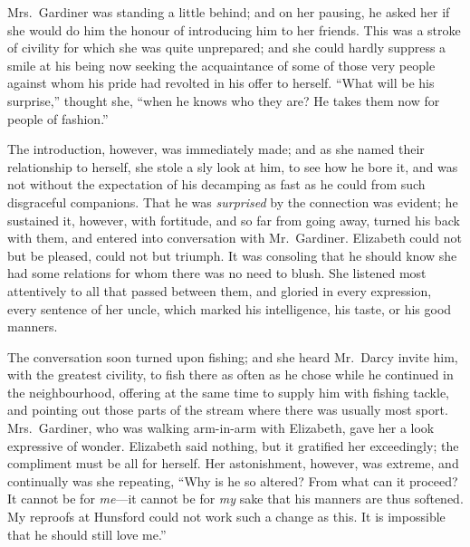 \documentclass[12pt,english,oneside]{book}
\begin{document}
Mrs.\ Gardiner was standing a little behind; and on her pausing,
he asked her if she would do him the honour of introducing him to
her friends. This was a stroke of civility for which she was quite
unprepared; and she could hardly suppress a smile at his being now
seeking the acquaintance of some of those very people against whom
his pride had revolted in his offer to herself. {}``What will be
his surprise,'' thought she, {}``when he knows who they are? He
takes them now for people of fashion.''

The introduction, however, was immediately made; and as she named
their relationship to herself, she stole a sly look at him, to see
how he bore it, and was not without the expectation of his decamping
as fast as he could from such disgraceful companions. That he was
\textit{surprised} by the connection was evident; he sustained it,
however, with fortitude, and so far from going away, turned his back
with them, and entered into conversation with Mr.\ Gardiner. Elizabeth
could not but be pleased, could not but triumph. It was consoling
that he should know she had some relations for whom there was no need
to blush. She listened most attentively to all that passed between
them, and gloried in every expression, every sentence of her uncle,
which marked his intelligence, his taste, or his good manners.

The conversation soon turned upon fishing; and she heard Mr.\ Darcy
invite him, with the greatest civility, to fish there as often as
he chose while he continued in the neighbourhood, offering at the
same time to supply him with fishing tackle, and pointing out those
parts of the stream where there was usually most sport. Mrs.\ Gardiner,
who was walking arm-in-arm with Elizabeth, gave her a look expressive
of wonder. Elizabeth said nothing, but it gratified her exceedingly;
the compliment must be all for herself. Her astonishment, however,
was extreme, and continually was she repeating, {}``Why is he so
altered? From what can it proceed? It cannot be for \textit{me}---it
cannot be for \textit{my} sake that his manners are thus softened.
My reproofs at Hunsford could not work such a change as this. It is
impossible that he should still love me.''
\end{document}
